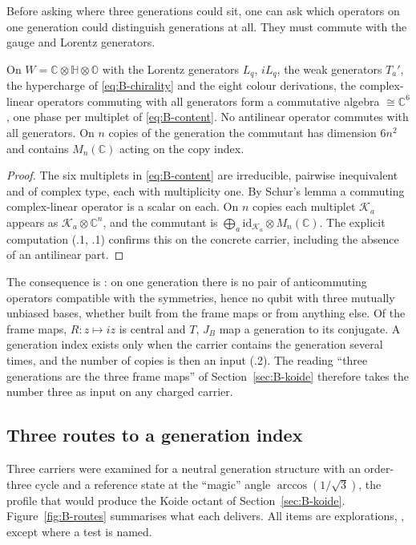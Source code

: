 Before asking where three generations could sit, one can ask which operators on one generation could distinguish
generations at all. They must commute with the gauge and Lorentz generators.

\begin{proposition}\label{prop:B-commutant}
On $W=\mathbb C\otimes\mathbb H\otimes\mathbb O$ with the Lorentz generators $L_q$, $iL_q$, the weak generators $T_a'$, the
hypercharge of \eqref{eq:B-chirality} and the eight colour derivations, the complex-linear operators commuting with all
generators form a commutative algebra $\cong\mathbb C^6$, one phase per multiplet of \eqref{eq:B-content}. No antilinear
operator commutes with all generators. On $n$ copies of the generation the commutant has dimension $6n^2$ and contains
$M_n(\mathbb C)$ acting on the copy index.
\end{proposition}

\begin{proof}
The six multiplets in \eqref{eq:B-content} are irreducible, pairwise inequivalent and of complex type, each with
multiplicity one. By Schur's lemma a commuting complex-linear operator is a scalar on each. On $n$ copies each multiplet
$\mathcal K_a$ appears as $\mathcal K_a\otimes\mathbb C^n$, and the commutant is $\bigoplus_a\mathrm{id}_{\mathcal K_a}\otimes M_n(\mathbb C)$.
The explicit computation (.1, .1) confirms this on the concrete carrier, including the absence of an
antilinear part.
\end{proof}

The consequence is \Established: on one generation there is no pair of anticommuting operators compatible with the symmetries, hence no qubit
with three mutually unbiased bases, whether built from the frame maps or from anything else. Of the frame maps,
$R\colon z\mapsto iz$ is central and $T$, $J_B$ map a generation to its conjugate. A generation index exists only when the
carrier contains the generation several times, and the number of copies is then an input (.2). The reading ``three
generations are the three frame maps'' of Section~\ref{sec:B-koide} therefore takes the number three as input on any
charged carrier.

\subsection{Three routes to a generation index}
\label{sec:B-routes}

Three carriers were examined for a neutral generation structure with an order-three cycle and a reference state at the
``magic'' angle $\arccos(1/\sqrt3)$, the profile that would produce the Koide octant of Section~\ref{sec:B-koide}.
Figure~\ref{fig:B-routes} summarises what each delivers. All items are explorations, \Exploration, except where a test
is named.

